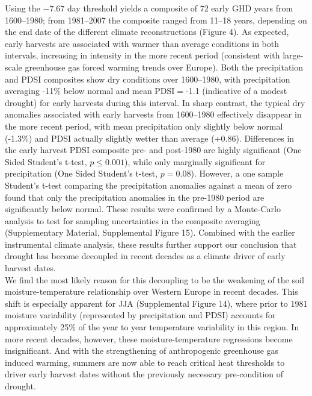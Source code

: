 \documentclass[final]{nature}
\begin{document}
\indent Using the $-7.67$ day threshold yields a composite of 72 early GHD years from 1600--1980; from 1981--2007 the composite ranged from 11--18 years, depending on the end date of the different climate reconstructions (Figure 4). As expected, early harvests are associated with warmer than average conditions in both intervals, increasing in intensity in the more recent period (consistent with large-scale greenhouse gas forced warming trends over Europe). Both the precipitation and PDSI composites show dry conditions over 1600--1980, with precipitation averaging -11\% below normal and mean PDSI$=$-1.1 (indicative of a modest drought) for early harvests during this interval. In sharp contrast, the typical dry anomalies associated with early harvests from 1600--1980 effectively disappear in the more recent period, with mean precipitation only slightly below normal (-1.3\%) and PDSI actually slightly wetter than average (+0.86). Differences in the early harvest PDSI composite pre- and post-1980 are highly significant (One Sided Student's t-test, $p\le0.001$), while only marginally significant for precipitation (One Sided Student's t-test, $p=0.08$). However, a one sample Student's t-test comparing the precipitation anomalies against a mean of zero found that only the precipitation anomalies in the pre-1980 period are significantly below normal. These results were confirmed by a Monte-Carlo analysis to test for sampling uncertainties in the composite averaging (Supplementary Material, Supplemental Figure 15). Combined with the earlier instrumental climate analysis, these results further support our conclusion that drought has become decoupled in recent decades as a climate driver of early harvest dates.\\
\indent We find the most likely reason for this decoupling to be the weakening of the soil moisture-temperature relationship over Western Europe in recent decades. This shift is especially apparent for JJA (Supplemental Figure 14), where prior to 1981 moisture variability (represented by precipitation and PDSI) accounts for approximately 25\% of the year to year temperature variability in this region. In more recent decades, however, these moisture-temperature regressions become insignificant. And with the strengthening of anthropogenic greenhouse gas induced warming, summers are now able to reach critical heat thresholds to driver early harvest dates without the previously necessary pre-condition of drought.\\
\end{document}
